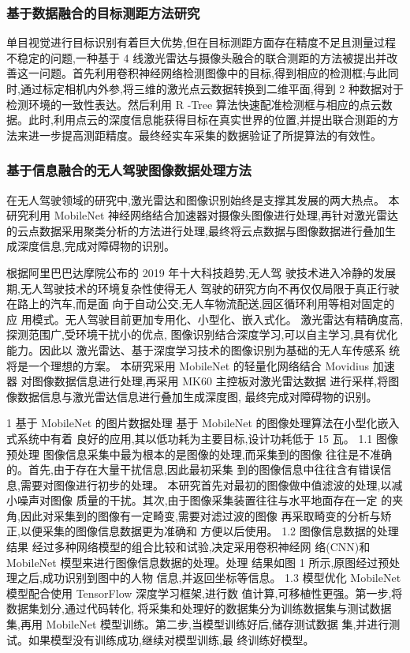 \documentclass{amsart}
\begin{document}
\subsubsection{基于数据融合的目标测距方法研究}
单目视觉进行目标识别有着巨大优势,但在目标测距方面存在精度不足且测量过程不稳定的问题,一种基于 4 线激光雷达与摄像头融合的联合测距的方法被提出并改善这一问题。首先利用卷积神经网络检测图像中的目标,得到相应的检测框;与此同时,通过标定相机内外参,将三维的激光点云数据转换到二维平面,得到 2 种数据对于检测环境的一致性表达。然后利用 R -Tree 算法快速配准检测框与相应的点云数据。此时,利用点云的深度信息能获得目标在真实世界的位置,并提出联合测距的方法来进一步提高测距精度。最终经实车采集的数据验证了所提算法的有效性。

\subsubsection{基于信息融合的无人驾驶图像数据处理方法}
\cite{戴耀威}在无人驾驶领域的研究中,激光雷达和图像识别始终是支撑其发展的两大热点。
本研究利用 MobileNet 神经网络结合加速器对摄像头图像进行处理,再针对激光雷达的云点数据采用聚类分析的方法进行处理,最终将云点数据与图像数据进行叠加生成深度信息,完成对障碍物的识别。

根据阿里巴巴达摩院公布的 2019 年十大科技趋势,无人驾
驶技术进入冷静的发展期,无人驾驶技术的环境复杂性使得无人
驾驶的研究方向不再仅仅局限于真正行驶在路上的汽车,而是面
向于自动公交,无人车物流配送,园区循环利用等相对固定的应
用模式。无人驾驶目前更加专用化、小型化、嵌入式化。
激光雷达有精确度高,探测范围广,受环境干扰小的优点,
图像识别结合深度学习,可以自主学习,具有优化能力。因此以
激光雷达、基于深度学习技术的图像识别为基础的无人车传感系
统将是一个理想的方案。
本研究采用 MobileNet 的轻量化网络结合 Movidius 加速器
对图像数据信息进行处理,再采用 MK60 主控板对激光雷达数据
进行采样,将图像数据信息与激光雷达信息进行叠加生成深度图,
最终完成对障碍物的识别。


1
基于 MobileNet 的图片数据处理
基于 MobileNet 的图像处理算法在小型化嵌入式系统中有着
良好的应用,其以低功耗为主要目标,设计功耗低于 15 瓦。
1.1 图像预处理
图像信息采集中最为根本的是图像的处理,而采集到的图像
往往是不准确的。首先,由于存在大量干扰信息,因此最初采集
到的图像信息中往往含有错误信息,需要对图像进行初步的处理。
本研究首先对最初的图像做中值滤波的处理,以减小噪声对图像
质量的干扰。其次,由于图像采集装置往往与水平地面存在一定
的夹角,因此对采集到的图像有一定畸变,需要对滤过波的图像
再采取畸变的分析与矫正,以便采集的图像信息数据更为准确和
方便以后使用。
1.2 图像信息数据的处理结果
经过多种网络模型的组合比较和试验,决定采用卷积神经网
络(CNN)和 MobileNet 模型来进行图像信息数据的处理。处理
结果如图 1 所示,原图经过预处理之后,成功识别到图中的人物
信息,并返回坐标等信息。
1.3 模型优化
MobileNet 模型配合使用 TensorFlow 深度学习框架,进行数
值计算,可移植性更强。第一步,将数据集划分,通过代码转化,
将采集和处理好的数据集分为训练数据集与测试数据集,再用
MobileNet 模型训练。第二步,当模型训练好后,储存测试数据
集,并进行测试。如果模型没有训练成功,继续对模型训练,最
终训练好模型。
\end{document}
